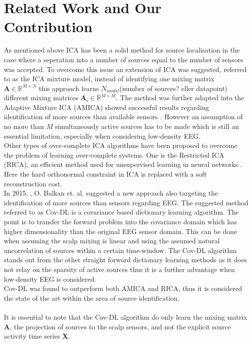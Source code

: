 \section{Related Work and Our Contribution} 
As mentioned above ICA has been a solid method for source localisation in the case where a seperation into a number of sources equal to the number of sensors was accepted. To overcome this issue an extension of ICA was suggested, referred to as the ICA mixture model, instead of identifying one mixing matrix $\mathbf{A}\in \mathbb{R}^{M\times N}$ this approach learns $N_{model}$(number of sources? eller datapoint) different mixing matrices $\mathbf{A}_i\in \mathbb{R}^{M\times M}$. The method was further adapted into the Adaptive Mixture ICA (AMICA) showed successful results regarding identification of more sources than available sensors \cite{Palmer2008}. However an assumption of no more than $M$ simultaneously active sources has to be made which is still an essential limitation, especially when considering low-density EEG. 
\\
Other types of over-complete ICA algorithms have been proposed to overcome the problem of learning over-complete systems. One is the Restricted ICA (RICA), an efficient method used for unsupervised learning in neural networks \cite{Le2011}. Here the hard orthonormal constraint in ICA is replaced with a soft reconstruction cost.
\\
In 2015, \cite{Balkan2015}, O. Balkan et. al. suggested a new approach also targeting the identification of more sources than sensors regarding EEG. The suggested method referred to as Cov-DL is a covariance based dictionary learning algorithm. The point is to transfer the forward problem into the covariance domain which has higher dimensionality than the original EEG sensor domain. This can be done when assuming the scalp mixing is linear and using the assumed natural uncorrelation of sources within a certain time-window. The Cov-DL algorithm stands out from the other straight forward dictionary learning methods as it does not relay on the sparsity of active sources thus it is a further advantage when low-density EEG is considered. 
\\
Cov-DL was found to outperform both AMICA and RICA, thus it is considered the state of the art within the area of source identification. 
\\ 
\\
It is essential to note that the Cov-DL algorithm do only learn the mixing matrix $\textbf{A}$, the projection of sources to the scalp sensors, and not the explicit source activity time series $\textbf{X}$.
